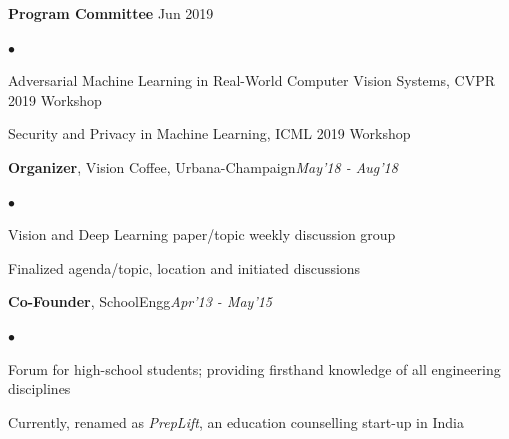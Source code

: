 \documentclass[margin,line]{res}
\newenvironment{list2}{
  \begin{list}{$\bullet$}{%
      \setlength{\itemsep}{0in}
      \setlength{\parsep}{0in} \setlength{\parskip}{0in}
      \setlength{\topsep}{0in} \setlength{\partopsep}{0in} 
      \setlength{\leftmargin}{0.2in}}}{\end{list}}
\begin{document}
\begin{resume}
{\bf Program Committee} {\hfill Jun 2019}\vspace*{-0.15in}\\
\begin{list2}
\item Adversarial Machine Learning in Real-World Computer Vision Systems, CVPR 2019 Workshop
\item Security and Privacy in Machine Learning, ICML 2019 Workshop
\end{list2}\vspace*{-0.05in} 
{\bf Organizer}, Vision Coffee, Urbana-Champaign{\hfill \em May'18 - Aug'18}\vspace*{-0.15in}\\
\begin{list2}
\item Vision and Deep Learning paper/topic weekly discussion group
\item Finalized agenda/topic, location and initiated discussions 
\end{list2}\vspace*{-0.05in} 
{\bf Co-Founder}, SchoolEngg{\hfill \em Apr'13 - May'15}\vspace*{-0.15in}\\
\begin{list2}
\item Forum for high-school students; providing firsthand knowledge of all engineering disciplines
\item Currently, renamed as {\em PrepLift}, an education counselling start-up in India
\end{list2}\vspace*{-0.05in} 

\end{resume}
\end{document}

